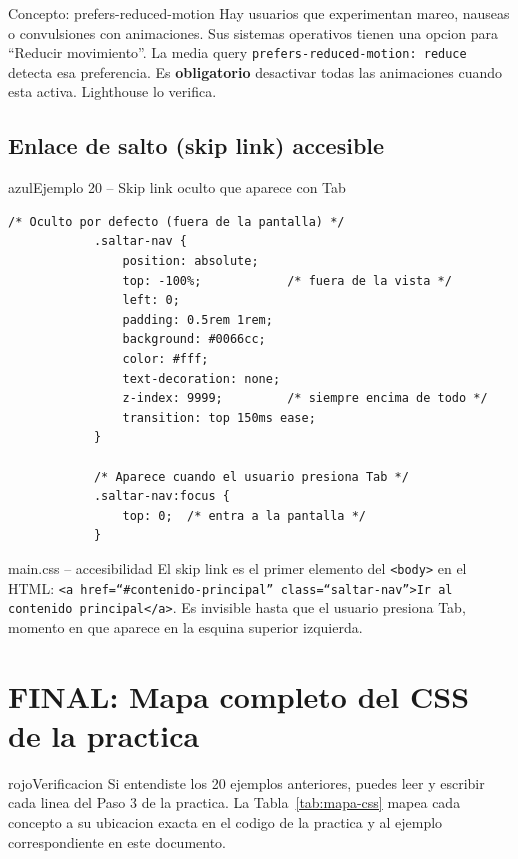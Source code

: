 \documentclass[11pt,a4paper]{article}
\begin{document}
	\begin{cajaconcepto}{Concepto: prefers-reduced-motion}
		Hay usuarios que experimentan mareo, nauseas o convulsiones con animaciones. Sus sistemas operativos tienen una opcion para ``Reducir movimiento''. La media query \texttt{prefers-reduced-motion: reduce} detecta esa preferencia. Es \textbf{obligatorio} desactivar todas las animaciones cuando esta activa. Lighthouse lo verifica.
	\end{cajaconcepto}
	
	\subsection{Enlace de salto (skip link) accesible}
	
	\begin{cajacodigo}{azul}{Ejemplo 20 -- Skip link oculto que aparece con Tab}
		\begin{lstlisting}[style=codecss]
			/* Oculto por defecto (fuera de la pantalla) */
			.saltar-nav {
				position: absolute;
				top: -100%;            /* fuera de la vista */
				left: 0;
				padding: 0.5rem 1rem;
				background: #0066cc;
				color: #fff;
				text-decoration: none;
				z-index: 9999;         /* siempre encima de todo */
				transition: top 150ms ease;
			}
			
			/* Aparece cuando el usuario presiona Tab */
			.saltar-nav:focus {
				top: 0;  /* entra a la pantalla */
			}
		\end{lstlisting}
	\end{cajacodigo}
	
	\begin{cajapractica}{main.css -- accesibilidad}
		El skip link es el primer elemento del \texttt{<body>} en el HTML: \texttt{<a href=``\#contenido-principal'' class=``saltar-nav''>Ir al contenido principal</a>}. Es invisible hasta que el usuario presiona Tab, momento en que aparece en la esquina superior izquierda.
	\end{cajapractica}
	
	\section{FINAL: Mapa completo del CSS de la practica}
	
	\begin{cajatip}{rojo}{Verificacion}
		Si entendiste los 20 ejemplos anteriores, puedes leer y escribir cada linea del Paso 3 de la practica. La Tabla~\ref{tab:mapa-css} mapea cada concepto a su ubicacion exacta en el codigo de la practica y al ejemplo correspondiente en este documento.
	\end{cajatip}
	
\end{document}

